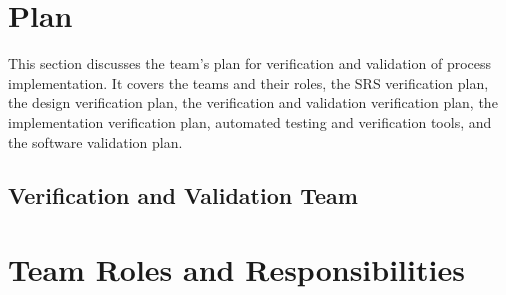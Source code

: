 \documentclass[12pt, titlepage]{article}
\begin{document}
\citet{SRS}


\section{Plan}

This section discusses the team's plan for verification and validation of process implementation. It covers the teams and their roles, the SRS verification plan, the design verification plan, the verification and validation verification plan, the implementation verification plan, automated testing and verification tools, and the software validation plan. 

\subsection{Verification and Validation Team}

\section{Team Roles and Responsibilities}
\end{document}

